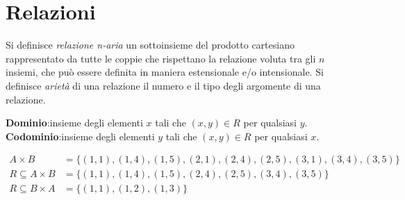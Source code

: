 \chapter{Relazioni}
Si definisce \textit{relazione n-aria} un sottoinsieme del prodotto cartesiano
rappresentato da tutte le coppie che rispettano la relazione voluta tra gli $n$ insiemi,
che può essere definita in maniera estensionale e/o intensionale. \newline
Si definisce \textit{arietà} di una relazione il numero e il tipo degli argomente
di una relazione.

\textbf{Dominio}:insieme degli elementi $x$ tali che $(x,y) \in R$ per qualsiasi $y$.\newline
\textbf{Codominio}:insieme degli elementi $y$ tali che $(x,y) \in R$ per qualsiasi $x$.

\begin{align*}
A \times B & = \{(1,1),(1,4),(1,5),(2,1),(2,4),(2,5),(3,1),(3,4),(3,5)\} \\
R \subseteq A \times B  & = \{(1,1),(1,4),(1,5),(2,4),(2,5),(3,4),(3,5)\}\\
R \subseteq B \times A & = \{(1,1),(1,2),(1,3)\} \\
\end{align*}
